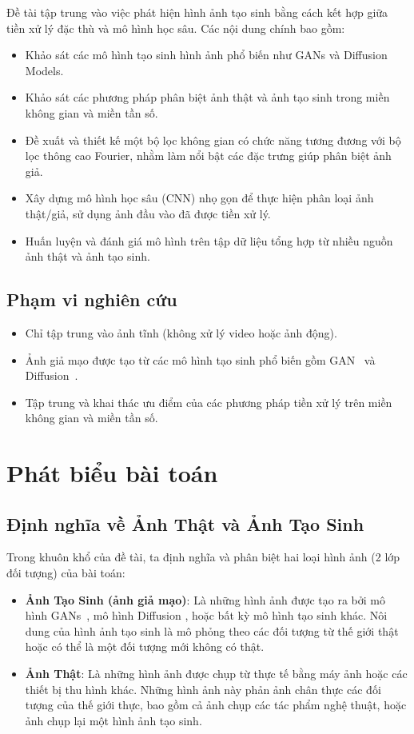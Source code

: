 Đề tài tập trung vào việc phát hiện hình ảnh tạo sinh bằng cách kết hợp giữa tiền xử lý đặc thù và mô hình học sâu. Các nội dung chính bao gồm:

\begin{itemize}
	\item Khảo sát các mô hình tạo sinh hình ảnh phổ biến như GANs và Diffusion Models.
	\item Khảo sát các phương pháp phân biệt ảnh thật và ảnh tạo sinh trong miền không gian và miền tần số.
	\item Đề xuất và thiết kế một bộ lọc không gian có chức năng tương đương với bộ lọc thông cao Fourier, nhằm làm nổi bật các đặc trưng giúp phân biệt ảnh giả.
	\item Xây dựng mô hình học sâu (CNN) nhọ gọn để thực hiện phân loại ảnh thật/giả, sử dụng ảnh đầu vào đã được tiền xử lý.
	\item Huấn luyện và đánh giá mô hình trên tập dữ liệu tổng hợp từ nhiều nguồn ảnh thật và ảnh tạo sinh.
\end{itemize}

\subsection{Phạm vi nghiên cứu}
	
\begin{itemize}
	\item Chỉ tập trung vào ảnh tĩnh (không xử lý video hoặc ảnh động).
	\item Ảnh giả mạo được tạo từ các mô hình tạo sinh phổ biến gồm GAN~\cite{Goodfellow2014GenerativeAN} và Diffusion~\cite{Ho2020DenoisingDP}.
	\item Tập trung và khai thác ưu điểm của các phương pháp tiền xử lý trên miền không gian và miền tần số.
\end{itemize} 
%
\section{Phát biểu bài toán}
%
\subsection{Định nghĩa về Ảnh Thật và Ảnh Tạo Sinh}
Trong khuôn khổ của đề tài, ta định nghĩa và phân biệt hai loại hình ảnh (2 lớp đối tượng) của bài toán:
\begin{itemize}  

    \item \textbf{Ảnh Tạo Sinh (ảnh giả mạo)}: Là những hình ảnh được tạo ra bởi mô hình GANs~\cite{Goodfellow2014GenerativeAN}, mô hình Diffusion \cite{Ho2020DenoisingDP}, hoặc bất kỳ mô hình tạo sinh khác. Nôi dung của hình ảnh tạo sinh là mô phỏng theo các đối tượng từ thế giới thật hoặc có thể là một đối tượng mới không có thật.
    
    \item \textbf{Ảnh Thật}: Là những hình ảnh được chụp từ thực tế bằng máy ảnh hoặc các thiết bị thu hình khác. Những hình ảnh này phản ảnh chân thực các đối tượng của thế giới thực, bao gồm cả ảnh chụp các tác phẩm nghệ thuật, hoặc ảnh chụp lại một hình ảnh tạo sinh.

\end{itemize}
%
